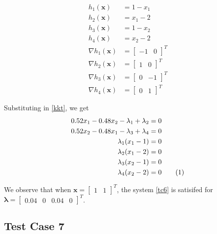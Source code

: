 \documentclass[a4paper]{article}
\newcommand{\numberthis}{\addtocounter{equation}{1}\tag{\theequation}}
\newcommand{\labeleqn}[1]{\numberthis \label{#1}}
\begin{document}
\begin{align*}
h_1(\textbf{x}) &= 1 - x_1 \\
h_2(\textbf{x}) &= x_1 - 2 \\
h_3(\textbf{x}) &= 1 - x_2 \\
h_4(\textbf{x}) &= x_2 - 2 \\
\nabla h_1(\textbf{x}) &= \begin{bmatrix} -1 & 0 \end{bmatrix} ^T \\
\nabla h_2(\textbf{x}) &= \begin{bmatrix} 1 & 0 \end{bmatrix} ^T \\
\nabla h_3(\textbf{x}) &= \begin{bmatrix} 0 & -1 \end{bmatrix} ^T \\
\nabla h_4(\textbf{x}) &= \begin{bmatrix} 0 & 1 \end{bmatrix} ^T
\end{align*}

Substituting in \eqref{kkt}, we get
\begin{align*}
0.52 x_1 - 0.48 x_2 - \lambda_1 + \lambda_2 &= 0 \\
0.52 x_2 - 0.48 x_1 - \lambda_3 + \lambda_4 &= 0 \\
\lambda_1 (x_1 - 1) &= 0 \\
\lambda_2 (x_1 - 2) &= 0 \\
\lambda_3 (x_2 - 1) &= 0 \\
\lambda_4 (x_2 - 2) &= 0 \labeleqn{tc6}
\end{align*}

We observe that when $\textbf{x} = \begin{bmatrix} 1 & 1 \end{bmatrix} ^T$, the system \eqref{tc6} is satisifed for $\boldsymbol{\lambda} = \begin{bmatrix} 0.04 & 0 & 0.04 & 0 \end{bmatrix} ^T$.

\subsection{Test Case 7}
\end{document}
